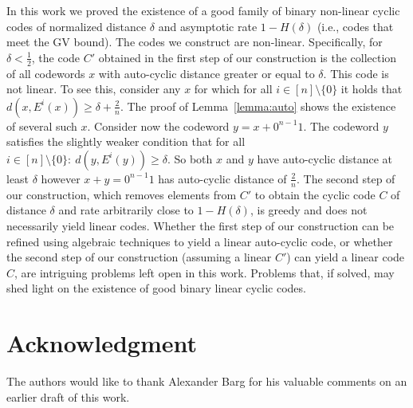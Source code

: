 \documentclass[twocolumn,twoside]{IEEEtran}
\theoremstyle{plain}
\renewcommand{\geq}{\geqslant}
\begin{document}
In this work we proved the existence of a good family of binary
non-linear cyclic codes of normalized distance $\delta$ and asymptotic
rate $1-H(\delta)$ (i.e., codes that meet the GV bound). The codes we
construct are non-linear. Specifically, for $\delta<\frac{1}{2}$, the code 
$C'$ obtained in the first step of our construction is the collection of all codewords $x$ with auto-cyclic distance greater or equal to $\delta$. This code is not linear. To see this, consider any $x$ for which for all $i \in [n] \setminus \{0\}$ it holds that $d(x,E^i(x)) \geq \delta + \frac{2}{n}$. The proof of Lemma~\ref{lemma:auto} shows the existence of several such $x$. Consider now the codeword $y=x + 0^{n-1}1$. The codeword $y$ satisfies the slightly weaker condition that for all $i \in [n] \setminus \{0\}:\ d(y,E^i(y)) \geq \delta$. So both $x$ and $y$ have auto-cyclic distance at least $\delta$ however $x+y=0^{n-1}1$ has auto-cyclic distance of $\frac{2}{n}$.
The second step of our construction, which removes elements from $C'$
to obtain the cyclic code $C$ of distance $\delta$ and rate
arbitrarily close to $1-H(\delta)$, is greedy and does not necessarily
yield linear codes. Whether the first step of our construction can be
refined using algebraic techniques to yield a linear auto-cyclic code, or
whether the second step of our construction (assuming a linear $C'$)
can yield a linear code $C$, are intriguing problems left open in this
work. Problems that, if solved, may shed light on the existence of
good binary linear cyclic codes.

\section{Acknowledgment}
The authors would like to thank Alexander Barg for his valuable
comments on an earlier draft of this work.





\end{document}
